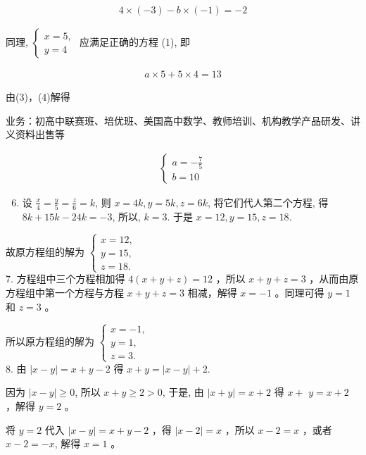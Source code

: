 \documentclass[10pt]{article}
\begin{document}
\begin{align*}
4 \times(-3)-b \times(-1)=-2 \tag{3}
\end{align*}

同理, $\left\{\begin{array}{l}x=5, \\ y=4\end{array}\right.$ 应满足正确的方程 (1), 即

\begin{align*}
a \times 5+5 \times 4=13 \tag{4}
\end{align*}

由(3)，(4)解得

业务：初高中联赛班、培优班、美国高中数学、教师培训、机构教学产品研发、讲义资料出售等

\begin{align*}
\left\{\begin{array}{l}
a=-\frac{7}{5} \\
b=10
\end{array}\right.
\end{align*}

\begin{enumerate}
  \setcounter{enumi}{5}
  \item 设 $\frac{x}{4}=\frac{y}{5}=\frac{z}{6}=k$, 则 $x=4 k, y=5 k, z=6 k$, 将它们代人第二个方程, 得 $8 k+15 k-24 k=-3$, 所以, $k=3$. 于是 $x=12, y=15, z=18$.
\end{enumerate}

故原方程组的解为 $\left\{\begin{array}{l}x=12, \\ y=15, \\ z=18 .\end{array}\right.$\\
7. 方程组中三个方程相加得 $4(x+y+z)=12$ ，所以 $x+y+z=3$ ，从而由原方程组中第一个方程与方程 $x+y+z=3$ 相减，解得 $x=-1$ 。同理可得 $y=1$ 和 $z=3$ 。

所以原方程组的解为 $\left\{\begin{array}{l}x=-1, \\ y=1, \\ z=3 .\end{array}\right.$\\
8. 由 $|x-y|=x+y-2$ 得 $x+y=|x-y|+2$.

因为 $|x-y| \geqslant 0$, 所以 $x+y \geqslant 2>0$, 于是, 由 $|x+y|=x+2$ 得 $x+$ $y=x+2$ ，解得 $y=2$ 。

将 $y=2$ 代入 $|x-y|=x+y-2$ ，得 $|x-2|=x$ ，所以 $x-2=x$ ，或者 $x-2=-x$, 解得 $x=1$ 。
\end{document}
